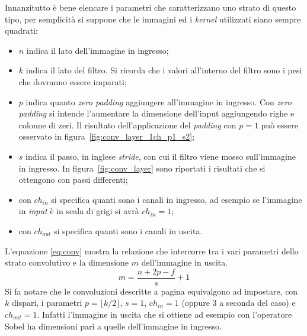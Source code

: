 Innanzitutto è bene elencare i parametri che caratterizzano uno strato di questo tipo, per semplicità si suppone che le immagini ed i \textit{kernel} utilizzati siano sempre quadrati:
\begin{itemize}
  \item $n$ indica il lato dell'immagine in ingresso;


  \item $k$ indica il lato del filtro.
    Si ricorda che i valori all'interno del filtro sono i pesi che dovranno essere imparati;

  \item $p$ indica quanto \textit{zero padding} aggiungere all'immagine in ingresso.
    Con \textit{zero padding} si intende l'aumentare la dimensione dell'input aggiungendo righe e colonne di zeri.
    Il risultato dell'applicazione del \textit{padding} con $p=1$ può essere osservato in figura~\ref{fig:conv_layer_1ch_p1_s2};

  \item $s$ indica il passo, in inglese \textit{stride}, con cui il filtro viene mosso sull'immagine in ingresso.
    In figura~\ref{fig:conv_layer} sono riportati i risultati che si ottengono con passi differenti;

  \item con $ch_{in}$ si specifica quanti sono i canali in ingresso, ad esempio se l'immagine in \textit{input} è in scala di grigi si avrà $ch_{in} = 1$;

  \item con $ch_{out}$ si specifica quanti sono i canali in uscita.

\end{itemize}
L'equazione \ref{eq:conv} mostra la relazione che intercorre tra i vari parametri dello strato convolutivo e la dimensione $m$ dell'immagine in uscita.
\begin{equation} \label{eq:conv}
  m = \frac
  {n + 2p - f}
  {s} 
  + 1
\end{equation}
Si fa notare che le convoluzioni descritte a pagina \pageref{conv_para} equivalgono ad impostare, con $k$ dispari, i parametri $p=\lfloor k/2 \rfloor$, $s=1$, $ch_{in}=1$ (oppure 3 a seconda del caso) e $ch_{out}=1$.
Infatti l'immagine in uscita che si ottiene ad esempio con l'operatore Sobel ha dimensioni pari a quelle dell'immagine in ingresso.


